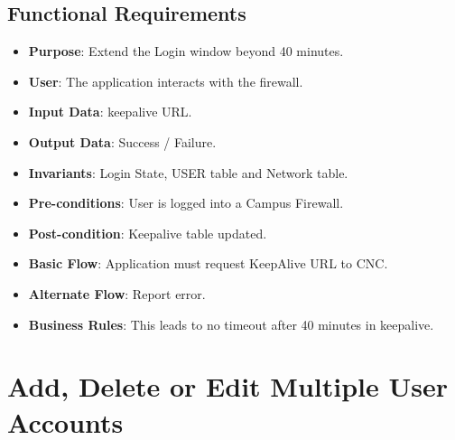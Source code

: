 \subsection{Functional Requirements}
\begin{itemize}
    \item  \textbf{Purpose}: Extend the Login window beyond 40 minutes.
    \item \textbf{User}: The application interacts with the firewall.
    \item \textbf{Input Data}: keepalive URL.
    \item \textbf{Output Data}: Success / Failure.
    \item \textbf{Invariants}: Login State, USER table and Network table.
    \item \textbf{Pre-conditions}: User is logged into a Campus Firewall.
    \item \textbf{Post-condition}: Keepalive table updated.
    \item \textbf{Basic Flow}: Application must request KeepAlive URL to CNC.
    \item \textbf{Alternate Flow}: Report error.
    \item \textbf{Business Rules}: This leads to no timeout after 40 minutes in keepalive.
\end{itemize}
\section{Add, Delete or Edit Multiple User Accounts}
